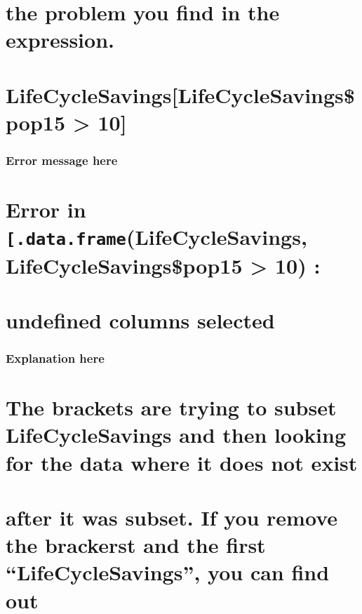 \documentclass[]{article}
\begin{document}
\section{the problem you find in the
expression.}\label{the-problem-you-find-in-the-expression.}

\section{LifeCycleSavings{[}LifeCycleSavings\$pop15 \textgreater{}
10{]}}\label{lifecyclesavingslifecyclesavingspop15-10}

\subsubsection{Error message here}\label{error-message-here}

\section{\texorpdfstring{Error in
\texttt{{[}.data.frame}(LifeCycleSavings, LifeCycleSavings\$pop15
\textgreater{} 10)
:}{Error in {[}.data.frame(LifeCycleSavings, LifeCycleSavings\$pop15 \textgreater{} 10) :}}\label{error-in-.data.framelifecyclesavings-lifecyclesavingspop15-10}

\section{undefined columns selected}\label{undefined-columns-selected}

\subsubsection{Explanation here}\label{explanation-here}

\section{The brackets are trying to subset LifeCycleSavings and then
looking for the data where it does not
exist}\label{the-brackets-are-trying-to-subset-lifecyclesavings-and-then-looking-for-the-data-where-it-does-not-exist}

\section{\texorpdfstring{after it was subset. If you remove the
brackerst and the first ``LifeCycleSavings'', you can find
out}{after it was subset. If you remove the brackerst and the first LifeCycleSavings, you can find out}}\label{after-it-was-subset.-if-you-remove-the-brackerst-and-the-first-lifecyclesavings-you-can-find-out}
\end{document}
